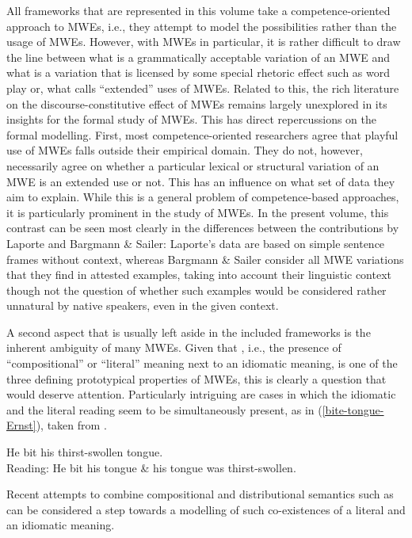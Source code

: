 \documentclass[output=paper]{langsci/langscibook}
\begin{document}
All frameworks that are represented in this volume take a competence-oriented approach to MWEs, i.e., they attempt to model the possibilities rather than the usage of MWEs. However, with MWEs in particular, it is rather difficult to draw the line between what is a grammatically acceptable variation of an MWE and what is a variation that is licensed by some special rhetoric effect such as word play or, what \citet{Egan:08} calls “extended” uses of MWEs. Related to this, the rich literature on the  discourse-constitutive effect of MWEs remains largely unexplored in its insights for the formal study of MWEs. This has direct repercussions on the formal modelling. First, most competence-oriented researchers agree that playful use of MWEs falls outside their empirical domain. They do not, however, necessarily agree on whether a particular lexical or structural variation of an MWE is an extended use or not. This has an influence on what set of data they aim to explain. While this is a general problem of competence-based approaches, it is particularly prominent in the study of MWEs. In the present volume, this contrast can be seen most clearly in the differences between the contributions by Laporte and Bargmann \& Sailer: Laporte’s data are based on simple sentence frames without context, whereas Bargmann \& Sailer consider all MWE variations that they find in attested examples, taking into account their linguistic context though not the question of whether such examples would be considered rather unnatural by native speakers, even in the given context.

A second aspect that is usually left aside in the included frameworks is the inherent ambiguity of many MWEs. Given that , i.e., the presence of ``compositional” or ``literal” meaning next to an idiomatic meaning, is one of the three defining prototypical properties of MWEs, this is clearly a question that would deserve attention. Particularly intriguing  are cases in which the idiomatic and the literal reading seem to be simultaneously present, as in (\ref{bite-tongue-Ernst}), taken from \citet{Ernst:81}. 

\ea \label{bite-tongue-Ernst} 
He bit his thirst-swollen tongue.\\
Reading: He bit his tongue \& his tongue was thirst-swollen.
\z

Recent attempts to combine compositional and distributional semantics such as  \citet{Gehrke:McNally:16} can be considered a step towards a modelling of such co-existences of a literal and an idiomatic meaning.
\end{document}
